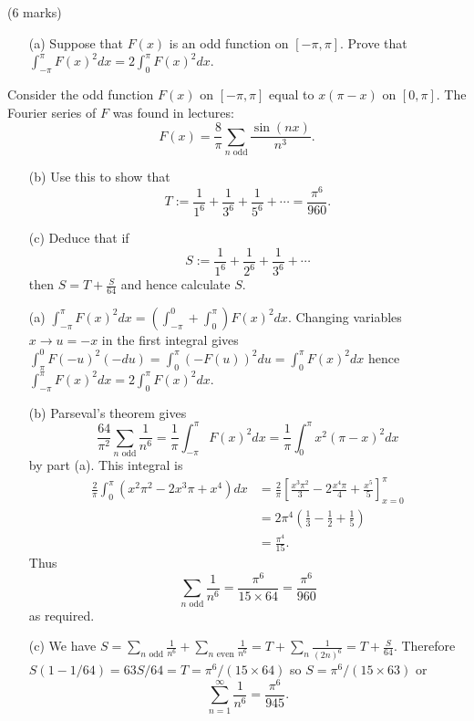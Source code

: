 \documentclass[12pt]{article}
\begin{document}
\vspace{0.5cm}

\begin{question}(6 marks)\\
\begin{enumerate}
\item[(a)] Suppose that $F(x)$ is an odd function on $[-\pi,\pi]$. Prove that $\int_{-\pi}^{\pi}F(x)^2dx=2\int_0^{\pi}F(x)^2dx$.
\end{enumerate}
Consider the odd function $F(x)$ on $[-\pi,\pi]$ equal to $x(\pi-x)$ on $[0,\pi]$. The Fourier series of $F$ was found in lectures:
\[F(x)=\frac{8}{\pi}\sum_{n\mbox{ odd}}\frac{\sin(nx)}{n^3}.\]
\begin{enumerate}
\item[(b)] Use this to show that
\[T:=\frac{1}{1^6}+\frac{1}{3^6}+\frac{1}{5^6}+\cdots=\frac{\pi^6}{960}.\]
\item[(c)] Deduce that if
\[S:=\frac{1}{1^6}+\frac{1}{2^6}+\frac{1}{3^6}+\cdots\]
then $S=T+\frac{S}{64}$ and hence calculate $S$.
\end{enumerate}
\end{question}


\begin{answer}
\begin{enumerate}
\item[(a)] $\int_{-\pi}^{\pi}F(x)^2dx=\left(\int_{-\pi}^0+\int_0^{\pi}\right)F(x)^2dx$. Changing variables $x\to u=-x$ in the first integral gives $\int_{\pi}^0F(-u)^2(-du)=\int_0^{\pi}(-F(u))^2du=\int_0^{\pi}F(x)^2dx$ hence $\int_{-\pi}^{\pi}F(x)^2dx=2\int_0^{\pi}F(x)^2dx$.
\item[(b)] Parseval's theorem gives
\[\frac{64}{\pi^2}\sum_{n\mbox{ odd}}\frac{1}{n^6}=\frac{1}{\pi}\int_{-\pi}^{\pi}F(x)^2dx=\frac{1}{\pi}\int_0^{\pi}x^2(\pi-x)^2dx\]
by part (a). This integral is
\begin{align*}
\frac{2}{\pi}\int_0^{\pi}(x^2\pi^2-2x^3\pi+x^4)dx&=\frac{2}{\pi}\left[\frac{x^3\pi^2}{3}-2\frac{x^4\pi}{4}+\frac{x^5}{5}\right]_{x=0}^{\pi}\\
&=2\pi^4\left(\frac{1}{3}-\frac{1}{2}+\frac{1}{5}\right)\\
&=\frac{\pi^4}{15}.
\end{align*}
Thus
\[\sum_{n\mbox{ odd}}\frac{1}{n^6}=\frac{\pi^6}{15\times 64}=\frac{\pi^6}{960}\]
as required.
\item[(c)] We have $S=\sum_{n\mbox{ odd}}\frac{1}{n^6}+\sum_{n\mbox{ even}}\frac{1}{n^6}=T+\sum_n\frac{1}{(2n)^6}=T+\frac{S}{64}$. Therefore $S(1-1/64)=63S/64=T=\pi^6/(15\times 64)$ so $S=\pi^6/(15\times 63)$ or
\[\sum_{n=1}^{\infty}\frac{1}{n^6}=\frac{\pi^6}{945}.\]
\end{enumerate}
\end{answer}
\newpage
\end{document}
